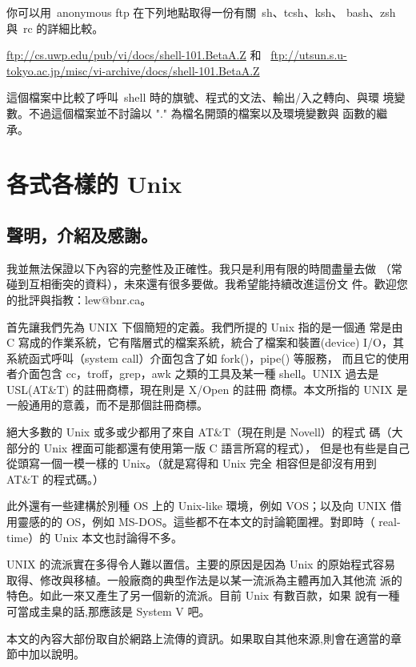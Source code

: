 \documentclass{article}
\begin{document}
\begin{CJK*}{Bg5}{ming}
	你可以用~anonymous ftp 在下列地點取得一份有關~sh、tcsh、ksh、
	bash、zsh 與~rc 的詳細比較。

      \url{ftp://cs.uwp.edu/pub/vi/docs/shell-101.BetaA.Z} 和~
      \url{ftp://utsun.s.u-tokyo.ac.jp/misc/vi-archive/docs/shell-101.BetaA.Z}

	這個檔案中比較了呼叫~shell 時的旗號、程式的文法、輸出/入之轉向、與環
	境變數。不過這個檔案並不討論以 "." 為檔名開頭的檔案以及環境變數與
	函數的繼承。

\section{各式各樣的 Unix}
\subsection{聲明，介紹及感謝。}

    我並無法保證以下內容的完整性及正確性。我只是利用有限的時間盡量去做
    （常碰到互相衝突的資料），未來還有很多要做。我希望能持續改進這份文
    件。歡迎您的批評與指教：lew@bnr.ca。
    
    首先讓我們先為 UNIX 下個簡短的定義。我們所提的 Unix 指的是一個通
    常是由 C 寫成的作業系統，它有階層式的檔案系統，統合了檔案和裝置(device)
    I/O，其系統函式呼叫（system call）介面包含了如 fork()，pipe() 等服務，
    而且它的使用者介面包含 cc，troff，grep，awk 之類的工具及某一種
    shell。UNIX 過去是 USL(AT\&T) 的註冊商標，現在則是 X/Open 的註冊
    商標。本文所指的 UNIX 是一般通用的意義，而不是那個註冊商標。
    
    絕大多數的 Unix 或多或少都用了來自 AT\&T（現在則是 Novell）的程式
    碼（大部分的 Unix 裡面可能都還有使用第一版 C 語言所寫的程式），
    但是也有些是自己從頭寫一個一模一樣的 Unix。（就是寫得和 Unix 完全
    相容但是卻沒有用到 AT\&T 的程式碼。）
    
    此外還有一些建構於別種 OS 上的 Unix-like 環境，例如 VOS；以及向 UNIX
    借用靈感的的 OS，例如 MS-DOS。這些都不在本文的討論範圍裡。對即時（
    real-time）的 Unix 本文也討論得不多。
    
    UNIX 的流派實在多得令人難以置信。主要的原因是因為 Unix 的原始程式容易
    取得、修改與移植。一般廠商的典型作法是以某一流派為主體再加入其他流
    派的特色。如此一來又產生了另一個新的流派。目前 Unix 有數百款，如果
    說有一種可當成圭臬的話,那應該是 System V 吧。
    
    本文的內容大部份取自於網路上流傳的資訊。如果取自其他來源,則會在適當的章
    節中加以說明。
   

\end{CJK*}
\end{document}
